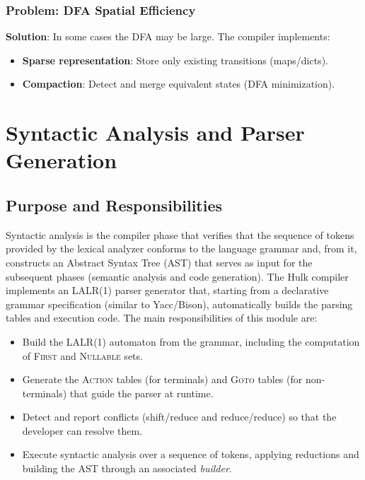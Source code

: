 \documentclass[12pt,a4paper]{report}
\begin{document}
\subsection{Problem: DFA Spatial Efficiency}

\textbf{Solution}: In some cases the DFA may be large. The compiler implements:
\begin{itemize}
    \item \textbf{Sparse representation}: Store only existing transitions (maps/dicts).
    \item \textbf{Compaction}: Detect and merge equivalent states (DFA minimization).
\end{itemize}

\chapter{Syntactic Analysis and Parser Generation}

\section{Purpose and Responsibilities}

Syntactic analysis is the compiler phase that verifies that the sequence of tokens provided by the lexical analyzer conforms to the language grammar and, from it, constructs an Abstract Syntax Tree (AST) that serves as input for the subsequent phases (semantic analysis and code generation).
The Hulk compiler implements an LALR(1) parser generator that, starting from a declarative grammar specification (similar to Yacc/Bison), automatically builds the parsing tables and execution code.
The main responsibilities of this module are:
\begin{itemize}
    \item Build the LALR(1) automaton from the grammar, including the computation of \textsc{First} and \textsc{Nullable} sets.
    \item Generate the \textsc{Action} tables (for terminals) and \textsc{Goto} tables (for non-terminals) that guide the parser at runtime.
    \item Detect and report conflicts (shift/reduce and reduce/reduce) so that the developer can resolve them.
    \item Execute syntactic analysis over a sequence of tokens, applying reductions and building the AST through an associated \textit{builder}.
\end{itemize}
\end{document}
